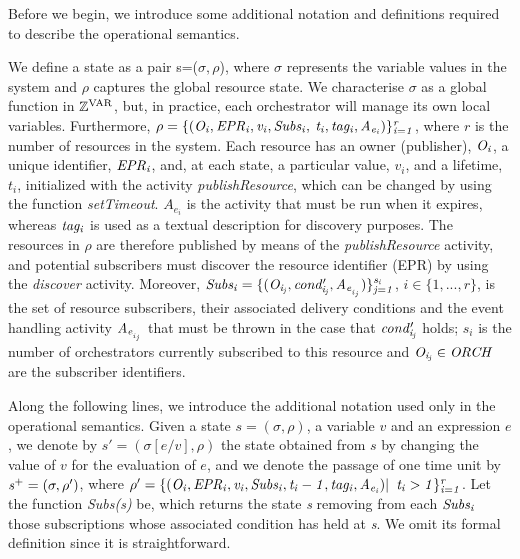 Before we begin, we introduce some additional notation and definitions required to describe the operational semantics.
\begin{definition}[State] %
We define a state as a pair s=($\sigma, \rho$), where $\sigma$ represents the variable values in the system and $\rho$ captures the global resource state. We characterise $\sigma$ as a global function in ${\it \mathbb{Z}^\textrm{VAR}}$, but, in practice, each orchestrator will manage its own local variables. Furthermore, $\it{ \rho=\{(O_i,EPR_i,v_i,Subs_i,}$ $\it{ t_i,tag_i,A_{e{_i}})\}_{i=1}^r}$, where $r$ is the number of resources in the system. Each resource has an owner (publisher), ${\it O_i}$, a unique identifier, ${\it EPR_i}$, and, at each state, a particular value, $v_i$, and a lifetime, $t_i$, initialized with the activity {\it publishResource}, which can be changed by using the function {\it setTimeout}. $A_{e{_i}}$ is the activity that must be run when it expires, whereas ${\it tag_i}$ is used as a textual description for discovery purposes. The resources in $\rho$ are therefore published by means of the {\em publishResource} activity, and potential subscribers must discover the resource identifier (EPR) by using the {\it discover} activity. %
Moreover, $\it{Subs_i=\{(O_{i_{j}},cond'_{i_{j}},A_{e{_{_i{_{_j}}}}})\}_{j=1}^{{s_i}}}$, $i \in \{1,...,r\}$, is the set of resource subscribers, their associated delivery conditions and the event handling activity ${\it A_{e{_{_i{_{_j}}}}}}$ that must be thrown in the case that ${\it cond'_{i_{j}}}$ holds; $s_i$ is the number of orchestrators currently subscribed to this resource and ${\it O_{i_{j}} \in ORCH}$ are the subscriber identifiers.
\end{definition}
\vspace{-0.5cm}
Along the following lines, we introduce the additional notation used only in the operational semantics. Given a state $s=(\sigma,\rho)$, a variable $v$ and an expression $e$, we denote by $s'=(\sigma[e/v],\rho)$ the state obtained from $s$
by changing the value of $v$ for the evaluation of $e$, and we denote the passage of one time unit by ${\it s{^+}=(\sigma,\rho')}$, where ${\it \rho'=\{(O_i,EPR_i,v_i,Subs_i,t_i-1,tag_i,A_{e{_i}})|}$ ${\it t_i>1\}_{i=1}^r}$. Let the function {\it Subs(s)} be, which returns the state {\it s} removing from each ${\it Subs_i}$ those subscriptions whose associated condition has held at {\it s}. %
We omit its formal definition since it is straightforward.

